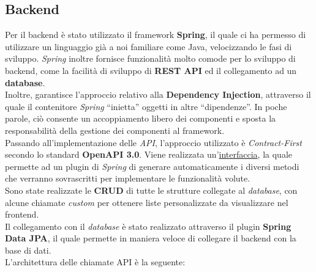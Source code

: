 \documentclass{article}
\begin{document}
\subsection*{Backend}
Per il backend è stato utilizzato il framework \textbf{Spring}, il quale ci ha permesso di utilizzare un linguaggio già a noi familiare come Java, velocizzando le fasi di sviluppo. \textit{Spring} inoltre fornisce funzionalità molto comode per lo sviluppo di backend, come la facilità di sviluppo di \textbf{REST API} ed il collegamento ad un \textbf{database}.\\
Inoltre, garantisce l'approccio relativo alla \textbf{Dependency Injection}, attraverso il quale il contenitore \textit{Spring} “inietta” oggetti in altre “dipendenze”. In poche parole, ciò consente un accoppiamento libero dei componenti e sposta la responsabilità della gestione dei componenti al framework.\vspace*{7pt}\\
Passando all'implementazione delle \textit{API}, l'approccio utilizzato è \textit{Contract-First} secondo lo standard \textbf{OpenAPI 3.0}. Viene realizzata un'\href{https://github.com/DavideDeRosa/storJ_SWE/blob/develop/backend/src/main/resources/interfaces/storj.yml}{interfaccia}, la quale permette ad un plugin di \textit{Spring} di generare automaticamente i diversi metodi che verranno sovrascritti per implementare le funzionalità volute.\\
Sono state realizzate le \textbf{CRUD} di tutte le strutture collegate al \textit{database}, con alcune chiamate \textit{custom} per ottenere liste personalizzate da visualizzare nel frontend.\vspace*{7pt}\\
Il collegamento con il \textit{database} è stato realizzato attraverso il plugin \textbf{Spring Data JPA}, il quale permette in maniera veloce di collegare il backend con la base di dati.\vspace*{7pt}\\
L'architettura delle chiamate API è la seguente:
\end{document}

